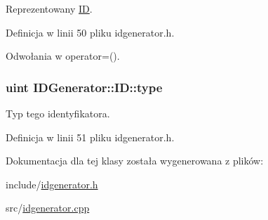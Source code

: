 Reprezentowany \hyperlink{classIDGenerator_1_1ID}{ID}. 



Definicja w linii 50 pliku idgenerator.h.



Odwołania w operator=().

\hypertarget{classIDGenerator_1_1ID_a336d735ce48e2bca744bc7d77c6792af}{
\subsubsection[{type}]{\setlength{\rightskip}{0pt plus 5cm}uint {\bf IDGenerator::ID::type}}}
\label{classIDGenerator_1_1ID_a336d735ce48e2bca744bc7d77c6792af}


Typ tego identyfikatora. 



Definicja w linii 51 pliku idgenerator.h.



Dokumentacja dla tej klasy została wygenerowana z plików:\begin{DoxyCompactItemize}
\item 
include/\hyperlink{idgenerator_8h}{idgenerator.h}\item 
src/\hyperlink{idgenerator_8cpp}{idgenerator.cpp}\end{DoxyCompactItemize}
